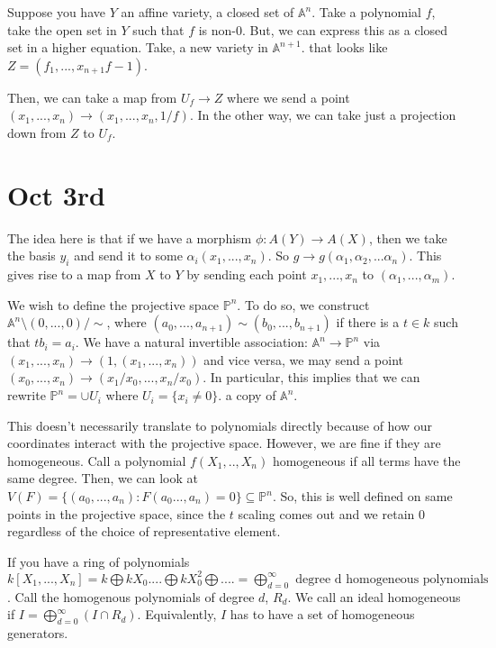 \documentclass[10pt]{article}
\begin{document}
Suppose you have $Y$ an affine variety, a closed set of $\mathbb{A}^n$. Take a polynomial $f$, take the open set in $Y$ such that $f$ is non-0. But, we can express this as a closed set in a higher equation. Take, a new variety in $\mathbb{A}^{n+1}$. that looks like $Z = (f_1,...,x_{n+1}f - 1)$.

Then, we can take a map from $U_f \to Z$ where we send a point $(x_1,...,x_n) \to (x_1,...,x_n, 1/f)$. In the other way, we can take just a projection down from $Z$ to $U_f$.

\section{Oct 3rd}

The idea here is that if we have a morphism $\phi: A(Y) \to A(X)$, then we take the basis $y_i$ and send it to some $\alpha_i (x_1,...,x_n)$. So $g \to g(\alpha_1,\alpha_2,...\alpha_n)$. This gives rise to a map from $X$ to $Y$ by sending each point $x_1,...,x_n$ to $(\alpha_1,...,\alpha_m)$.

We wish to define the projective space $\mathbb{P}^n$. To do so, we construct $\mathbb{A}^n \setminus (0,...,0) / \sim$, where $(a_0,...,a_{n+1}) \sim (b_0,...,b_{n+1})$ if there is a $t \in k$ such that $tb_i = a_i$. We have a natural invertible association: $\mathbb{A}^n \to \mathbb{P}^n$ via $(x_1,...,x_n) \to (1,(x_1,...,x_n))$ and vice versa, we may send a point $(x_0,...,x_n) \to (x_1/x_0,...,x_n/x_0)$. In particular, this implies that we can rewrite $\mathbb{P}^n = \cup U_i$ where $U_i = \{ x_i \not = 0 \}$. a copy of $\mathbb{A}^n$.

This doesn’t necessarily translate to polynomials directly because of how our coordinates interact with the projective space. However, we are fine if they are homogeneous. Call a polynomial $f(X_1,..,X_n)$ homogeneous if all terms have the same degree. Then, we can look at $V(F) = \{ (a_0,...,a_n) : F(a_0...,a_n) = 0 \} \subseteq \mathbb{P}^n$. So, this is well defined on same points in the projective space, since the $t$ scaling comes out and we retain $0$ regardless of the choice of representative element.

If you have a ring of polynomials  $k[X_1,...,X_n] = k \bigoplus kX_0 .... \bigoplus kX_0^2 \bigoplus.... = \bigoplus_{d=0}^\infty \text{ degree d homogeneous polynomials }$. Call the homogenous polynomials of degree $d$, $R_d$. We call an ideal homogeneous if $I = \bigoplus_{d=0}^\infty (I \cap R_d)$. Equivalently, $I$ has to have a set of homogeneous generators.
\end{document}
